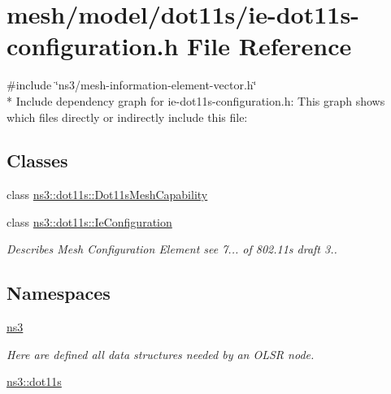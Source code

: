 \hypertarget{ie-dot11s-configuration_8h}{}\section{mesh/model/dot11s/ie-\/dot11s-\/configuration.h File Reference}
\label{ie-dot11s-configuration_8h}
{\ttfamily \#include \char`\"{}ns3/mesh-\/information-\/element-\/vector.\+h\char`\"{}}\\*
Include dependency graph for ie-\/dot11s-\/configuration.h\+:
This graph shows which files directly or indirectly include this file\+:
\subsection*{Classes}
\begin{DoxyCompactItemize}
\item 
class \hyperlink{classns3_1_1dot11s_1_1Dot11sMeshCapability}{ns3\+::dot11s\+::\+Dot11s\+Mesh\+Capability}
\item 
class \hyperlink{classns3_1_1dot11s_1_1IeConfiguration}{ns3\+::dot11s\+::\+Ie\+Configuration}
\begin{DoxyCompactList}\small\item\em Describes Mesh Configuration Element see 7... of 802.\+11s draft 3.. \end{DoxyCompactList}\end{DoxyCompactItemize}
\subsection*{Namespaces}
\begin{DoxyCompactItemize}
\item 
 \hyperlink{namespacens3}{ns3}
\begin{DoxyCompactList}\small\item\em Here are defined all data structures needed by an O\+L\+SR node. \end{DoxyCompactList}\item 
 \hyperlink{namespacens3_1_1dot11s}{ns3\+::dot11s}
\end{DoxyCompactItemize}
